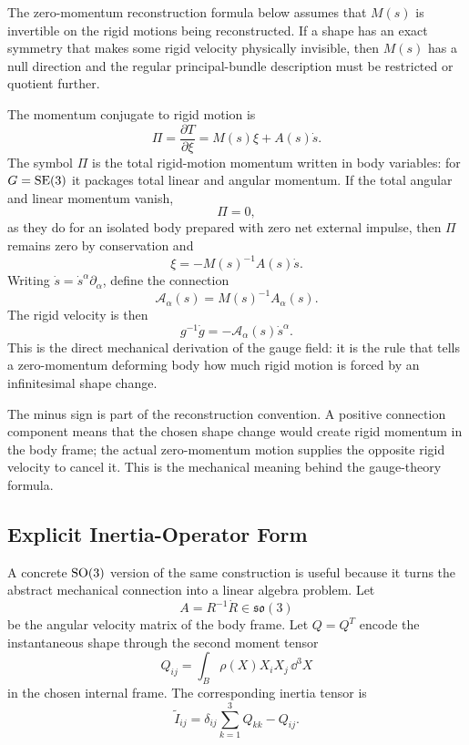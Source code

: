 \begin{hypothesis}
The zero-momentum reconstruction formula below assumes that \(M(s)\) is
invertible on the rigid motions being reconstructed.  If a shape has an exact
symmetry that makes some rigid velocity physically invisible, then \(M(s)\)
has a null direction and the regular principal-bundle description must be
restricted or quotient further.
\end{hypothesis}

The momentum conjugate to rigid motion is
\[
  \Pi=\frac{\partial T}{\partial \xi}=M(s)\xi+A(s)\dot s.
\]
The symbol \(\Pi\) is the total rigid-motion momentum written in body
variables: for \(G=\operatorname{SE}(3)\) it packages total linear and angular momentum.
If the total angular and linear momentum vanish,
\[
  \Pi=0,
\]
as they do for an isolated body prepared with zero net external impulse, then
\(\Pi\) remains zero by conservation and
\[
  \xi=-M(s)^{-1}A(s)\dot s.
\]
Writing \(\dot s=\dot s^\alpha\partial_\alpha\), define the connection
\[
  \boxed{
  \mathcal A_\alpha(s)=M(s)^{-1}A_\alpha(s).
  }
\]
The rigid velocity is then
\[
  \boxed{
  g^{-1}\dot g=-\mathcal A_\alpha(s)\dot s^\alpha.
  }
\]
This is the direct mechanical derivation of the gauge field: it is the rule that tells a
zero-momentum deforming body how much rigid motion is forced by an infinitesimal
shape change.

The minus sign is part of the reconstruction convention. A positive connection
component means that the chosen shape change would create rigid momentum in the
body frame; the actual zero-momentum motion supplies the opposite rigid
velocity to cancel it. This is the mechanical meaning behind the gauge-theory
formula.

\subsection{Explicit Inertia-Operator Form}
\label{subsec:explicit-gauge-equation}

A concrete \(\operatorname{SO}(3)\) version of the same construction is useful because it
turns the abstract mechanical connection into a linear algebra problem. Let
\[
  A=R^{-1}\dot R\in\mathfrak{so}(3)
\]
be the angular velocity matrix of the body frame. Let \(Q=Q^T\) encode the
instantaneous shape through the second moment tensor
\[
  Q_{ij}=\int_B\rho(X)X_iX_j\,\dd^3X
\]
in the chosen internal frame. The corresponding inertia tensor is
\[
  \widetilde I_{ij}
  =
  \delta_{ij}\sum_{k=1}^3Q_{kk}-Q_{ij}.
\]

